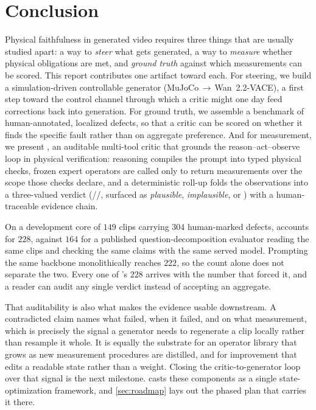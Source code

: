\section{Conclusion}\label{sec:conclusion}
Physical faithfulness in generated video requires three things that are usually
studied apart: a way to \emph{steer} what gets generated, a way to \emph{measure}
whether physical obligations are met, and \emph{ground truth} against which
measurements can be scored. This report contributes one artifact toward each. For
steering, we build a simulation-driven controllable generator
(MuJoCo\,$\rightarrow$\,Wan~2.2-VACE), a first step toward the control channel
through which a critic might one day feed corrections back into generation. For
ground truth, we assemble a benchmark of human-annotated, localized defects, so
that a critic can be scored on whether it finds the specific fault rather than on
aggregate preference. And for measurement, we present \PhyReAct{}, an auditable
multi-tool critic that grounds the reason--act--observe loop in physical
verification: reasoning compiles the prompt into typed physical checks, frozen
expert operators are called only to return measurements over the scope those
checks declare, and a deterministic roll-up folds the observations into a
three-valued verdict (\supported{}/\contradicted{}/\unknownv{}, surfaced as
\emph{plausible}, \emph{implausible}, or \abstain{}) with a human-traceable
evidence chain.

On a development core of $149$ clips carrying $304$ human-marked defects,
\PhyReAct{} accounts for $228$, against $164$ for a published question-decomposition
evaluator reading the same clips and checking the same claims with the same served
model. Prompting the same backbone monolithically reaches $222$, so the count alone does not
separate the two. Every one of \PhyReAct{}'s $228$ arrives with the number that forced it, and
a reader can audit any single verdict instead of accepting an aggregate.

That auditability is also what makes the evidence usable downstream. A contradicted
claim names what failed, when it failed, and on what measurement, which is precisely
the signal a generator needs to regenerate a clip locally rather than resample it
whole. It is equally the substrate for an operator library that grows as new
measurement procedures are distilled, and for improvement that edits a readable state
rather than a weight. Closing the critic-to-generator loop over that signal is the
next milestone.  casts these components as a single state-optimization
framework, and \cref{sec:roadmap} lays out the phased plan that carries it there.


